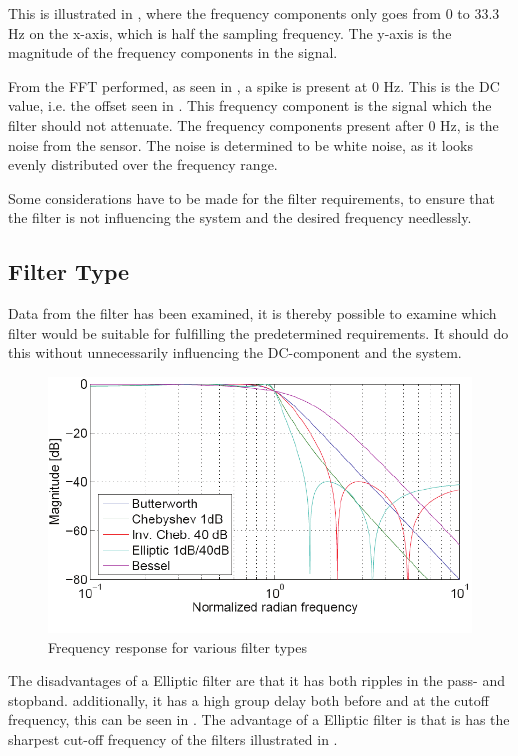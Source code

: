 This is illustrated in , where the frequency components only goes from 0 to 33.3 Hz on the x-axis, which is half the sampling frequency. The y-axis is the magnitude of the frequency components in the signal.

From the FFT performed, as seen in , a spike is present at 0 \si{Hz}. This is the DC value, i.e. the offset seen in . This frequency component is the signal which the filter should not attenuate. The frequency components present after 0 Hz, is the noise from the sensor. The noise is determined to be white noise, as it looks evenly distributed over the frequency range.

Some considerations have to be made for the filter requirements, to ensure that the filter is not influencing the system and the desired frequency needlessly.

\subsection{Filter Type}
Data from the filter has been examined, it is thereby possible to examine which filter would be suitable for fulfilling the predetermined requirements. It should do this without unnecessarily influencing the DC-component and the system.

\begin{figure}[H]
	\centering
	\includegraphics[scale=1]{figures/Filtertypes1.pdf}
	\caption{Frequency response for various filter types}
	\label{fig:Filtertype1}
\end{figure}

The disadvantages of a Elliptic filter are that it has both ripples in the pass- and stopband. additionally, it has a high group delay both before and at the cutoff frequency, this can be seen in . The advantage of a Elliptic filter is that is has the sharpest cut-off frequency of the filters illustrated in .

